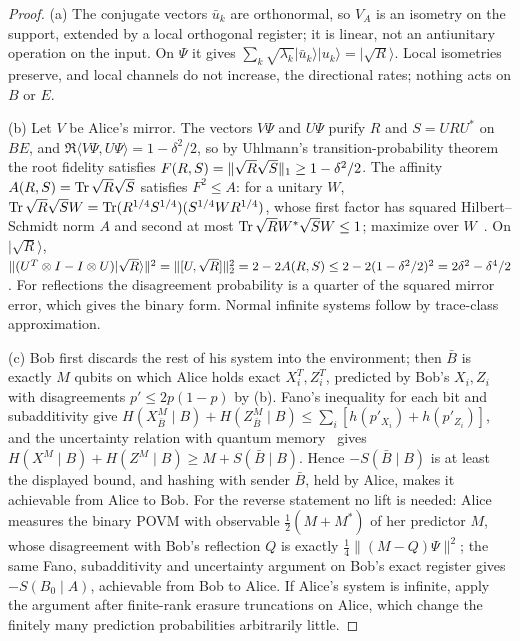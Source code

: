 \begin{proof}
(a) The conjugate vectors $\bar u_k$ are orthonormal, so $V_A$ is an isometry on the support, extended by a local
orthogonal register; it is linear, not an antiunitary operation on the input. On $\Psi$ it gives
$\sum_k\sqrt{\lambda_k}|\bar u_k\rangle|u_k\rangle=|\sqrt R\rangle$. Local isometries preserve, and local channels do not
increase, the directional rates; nothing acts on $B$ or $E$.

(b) Let $V$ be Alice's mirror. The vectors $V\Psi$ and $U\Psi$ purify $R$ and $S=URU^*$ on $BE$, and
$\Re\langle V\Psi,U\Psi\rangle=1-\delta^2/2$, so by Uhlmann's transition-probability theorem~\cite{Uhl76} the root fidelity satisfies
$F(R,S)=\lVert \sqrt R\sqrt S\rVert_1\ge1-\delta^2/2$. The affinity $A(R,S)=\operatorname{Tr}\sqrt R\sqrt S$ satisfies $F^2\le A$: for a unitary
$W$, $\operatorname{Tr}\sqrt R\sqrt SW=\operatorname{Tr}(R^{1/4}S^{1/4})(S^{1/4}WR^{1/4})$, whose first factor has squared Hilbert--Schmidt norm $A$ and
second at most $\operatorname{Tr}\sqrt RW^*\sqrt SW\le1$; maximize over $W$~\cite[(44)]{IRS17}. On $|\sqrt R\rangle$,
$\|(U^T\otimes I-I\otimes U)|\sqrt R\rangle\|^2=\lVert [U,\sqrt R]\rVert_2^2=2-2A(R,S)\le2-2(1-\delta^2/2)^2=2\delta^2-\delta^4/2$. For
reflections the disagreement probability is a quarter of the squared mirror error, which gives the binary form. Normal
infinite systems follow by trace-class approximation.

(c) Bob first discards the rest of his system into the environment; then $\bar B$ is exactly $M$ qubits on which Alice
holds exact $X_i^T,Z_i^T$, predicted by Bob's $X_i,Z_i$ with disagreements $p'\le2p(1-p)$ by (b). Fano's inequality for
each bit and subadditivity give $H(X^M_{\bar B}\mid B)+H(Z^M_{\bar B}\mid B)\le\sum_i[h(p'_{X_i})+h(p'_{Z_i})]$, and the
uncertainty relation with quantum memory~\cite{BCCRR10} gives $H(X^M\mid B)+H(Z^M\mid B)\ge M+S(\bar B\mid B)$. Hence
$-S(\bar B\mid B)$ is at least the displayed bound, and hashing with sender $\bar B$, held by Alice, makes it achievable
from Alice to Bob. For the reverse statement no lift is needed: Alice measures the binary POVM with observable
$\frac12(M+M^*)$ of her predictor $M$, whose disagreement with Bob's reflection $Q$ is exactly
$\frac14\|(M-Q)\Psi\|^2$; the same Fano, subadditivity and uncertainty argument on Bob's exact register gives
$-S(B_0\mid A)$, achievable from Bob to Alice. If Alice's system is infinite, apply the argument after finite-rank
erasure truncations on Alice, which change the finitely many prediction probabilities arbitrarily little.
\end{proof}

